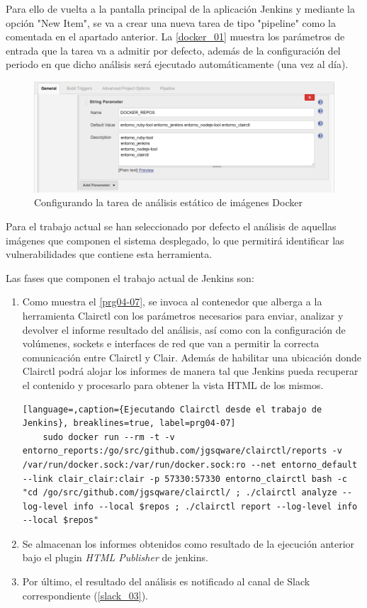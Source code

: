 Para ello de vuelta a la pantalla principal de la aplicación Jenkins y mediante la opción "New Item", se va a crear una nueva tarea de tipo "pipeline" como la comentada en el apartado anterior. La \autoref{docker_01} muestra los parámetros de entrada que la tarea va a admitir por defecto, además de la configuración del periodo en que dicho análisis será ejecutado automáticamente (una vez al día).

\begin{figure}[htbp]
	\centering
	\includegraphics[width=1.00\linewidth]
	{desarrollo/figuras/docker_01.png}
	\caption{Configurando la tarea de análisis estático de imágenes Docker}
	\label{docker_01}
\end{figure}

Para el trabajo actual se han seleccionado por defecto el análisis de aquellas imágenes que componen el sistema desplegado, lo que permitirá identificar las vulnerabilidades que contiene esta herramienta.

Las fases que componen el trabajo actual de Jenkins son:

\begin{enumerate}
	\item Como muestra el \autoref{prg04-07}, se invoca al contenedor que alberga a la herramienta Clairctl con los parámetros necesarios para enviar, analizar y devolver el informe resultado del análisis, así como con la configuración de volúmenes, sockets e interfaces de red que van a permitir la correcta comunicación entre Clairctl y Clair. Además de habilitar una ubicación donde Clairctl podrá alojar los informes de manera tal que Jenkins pueda recuperar el contenido y procesarlo para obtener la vista HTML de los mismos.
	\begin{lstlisting}[language=,caption={Ejecutando Clairctl desde el trabajo de Jenkins}, breaklines=true, label=prg04-07]
	sudo docker run --rm -t -v entorno_reports:/go/src/github.com/jgsqware/clairctl/reports -v /var/run/docker.sock:/var/run/docker.sock:ro --net entorno_default --link clair_clair:clair -p 57330:57330 entorno_clairctl bash -c "cd /go/src/github.com/jgsqware/clairctl/ ; ./clairctl analyze --log-level info --local $repos ; ./clairctl report --log-level info --local $repos"
	\end{lstlisting}
	\item Se almacenan los informes obtenidos como resultado de la ejecución anterior bajo el plugin \textit{HTML Publisher} de jenkins.
	\item Por último, el resultado del análisis es notificado al canal de Slack correspondiente (\autoref{slack_03}). 
\end{enumerate}

